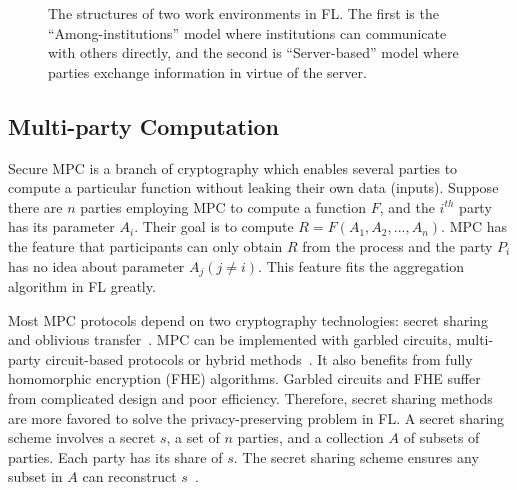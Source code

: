 \begin{figure}[!ht]
    \centering
    \hfil
    \caption{The structures of two work environments in FL. The first is the ``Among-institutions'' model where institutions can communicate with others directly, and the second is ``Server-based'' model where parties exchange information in virtue of the server.}
    \label{fl_sit}
\end{figure}

\subsection{Multi-party Computation}
Secure MPC is a branch of cryptography which enables several parties to compute a particular function without leaking their own data (inputs). Suppose there are $n$ parties employing MPC to compute a function $F$, and the $i^{th}$ party has its parameter $A_i$. Their goal is to compute $R = F(A_1, A_2, ..., A_n)$. MPC has the feature that participants can only obtain $R$ from the process and the party $P_i$ has no idea about parameter $A_j (j \ne i)$. This feature fits the aggregation algorithm in FL greatly.

Most MPC protocols depend on two cryptography technologies: secret sharing~\cite{Shamir} and oblivious transfer~\cite{OT}. MPC can be implemented with garbled circuits, multi-party circuit-based protocols or hybrid methods~\cite{mpc-sok}. It also benefits from fully homomorphic encryption (FHE) algorithms. Garbled circuits and FHE suffer from complicated design and poor efficiency. Therefore, secret sharing methods are more favored to solve the privacy-preserving problem in FL. A secret sharing scheme involves a secret $s$, a set of $n$ parties, and a collection $A$ of subsets of parties. Each party has its share of $s$. The secret sharing scheme ensures any subset in $A$ can reconstruct $s$~\cite{Secret-Sharing-survey}. 

